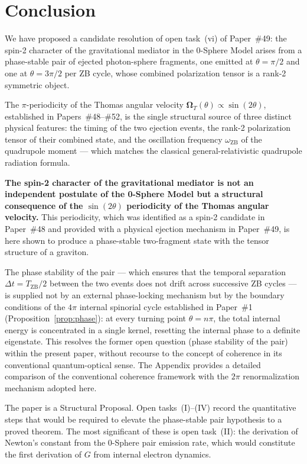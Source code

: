 \documentclass[%
 reprint, amsmath,amssymb, aps, prb, ]{revtex4-2}
\numberwithin{equation}{section}
\newcommand{\iphase}{\theta}
\newcommand{\omZB}{\omega_{\text{ZB}}}
\newcommand{\OmT}{\boldsymbol{\Omega}_T}
\begin{document}
\section{Conclusion}
\label{sec:conclusion}

We have proposed a candidate resolution of open task~(vi) of Paper~\#49: the spin-2 character of the gravitational mediator in the 0-Sphere Model arises from a phase-stable pair of ejected photon-sphere fragments, one emitted at $\iphase = \pi/2$ and one at $\iphase = 3\pi/2$ per ZB cycle, whose combined polarization tensor is a rank-2 symmetric object.

The $\pi$-periodicity of the Thomas angular velocity $\OmT(\iphase) \propto \sin(2\iphase)$, established in Papers~\#48--\#52, is the single structural source of three distinct physical features: the timing of the two ejection events, the rank-2 polarization tensor of their combined state, and the oscillation frequency $\omZB$ of the quadrupole moment --- which matches the classical general-relativistic quadrupole radiation formula.

\textbf{The spin-2 character of the gravitational mediator is not an independent postulate of the 0-Sphere Model but a structural consequence of the $\sin(2\iphase)$ periodicity of the Thomas angular velocity.}
This periodicity, which was identified as a spin-2 candidate in Paper~\#48 and provided with a physical ejection mechanism in Paper~\#49, is here shown to produce a phase-stable two-fragment state with the tensor structure of a graviton.

The phase stability of the pair --- which ensures that the temporal separation $\Delta t = T_\mathrm{ZB}/2$ between the two events does not drift across successive ZB cycles --- is supplied not by an external phase-locking mechanism but by the boundary conditions of the $4\pi$ internal spinorial cycle established in Paper~\#1 (Proposition~\ref{prop:phase}): at every turning point $\iphase = n\pi$, the total internal energy is concentrated in a single kernel, resetting the internal phase to a definite eigenstate.
This resolves the former open question (phase stability of the pair) within the present paper, without recourse to the concept of coherence in its conventional quantum-optical sense.
The Appendix provides a detailed comparison of the conventional coherence framework with the $2\pi$ renormalization mechanism adopted here.

The paper is a Structural Proposal.
Open tasks~(I)--(IV) record the quantitative steps that would be required to elevate the phase-stable pair hypothesis to a proved theorem.
The most significant of these is open task~(II): the derivation of Newton's constant from the 0-Sphere pair emission rate, which would constitute the first derivation of $G$ from internal electron dynamics.
\end{document}
